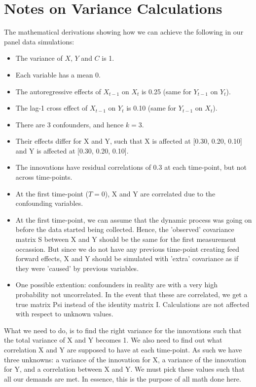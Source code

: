 \documentclass{article}
\begin{document}
\section*{Notes on Variance Calculations}
The mathematical derivations showing how we can achieve the following in our panel data simulations:

\begin{itemize}
    \item The variance of $X$, $Y$ and $C$ is 1.
    \item Each variable has a mean 0.
    \item The autoregressive effects of $X_{t-1}$ on $X_t$ is 0.25 (same for $Y_{t-1}$ on $Y_t$).
    \item The lag-1 cross effect of $X_{t-1}$ on $Y_t$ is 0.10 (same for $Y_{t-1}$ on $X_t$).
    \item There are 3 confounders, and hence $k=3$.
    \item Their effects differ for X and Y, such that X is affected at [0.30, 0.20, 0.10] and Y is affected at [0.30, 0.20, 0.10].
    \item The innovations have residual correlations of 0.3 at each time-point, but not across time-points.
    \item At the first time-point ($T=0$), X and Y are correlated due to the confounding variables.
    \item At the first time-point, we can assume that the dynamic process was going on before the data started being collected. Hence,
    the 'observed' covariance matrix S between X and Y should be the same for the first measurement occassion. But since we do not have 
    any previous time-point creating feed forward effects, X and Y should be simulated with 'extra' covariance as if they were 'caused' 
    by previous variables.
    \item One possible extention: confounders in reality are with a very high probability not uncorrelated. In the event that these are 
    correlated, we get a true matrix Psi instead of the identity matrix I. Calculations are not affected with respect to unknown values. 
\end{itemize}

What we need to do, is to find the right variance for the innovations such that the total variance of X and Y becomes 1. We also need to find
out what correlation X and Y are supposed to have at each time-point. As such we have three unknowns: a variance of the innovation for X,
a variance of the innovation for Y, and a correlation between X and Y. We must pick these values such that all our demands are met. In essence,
this is the purpose of all math done here. 
\end{document}
